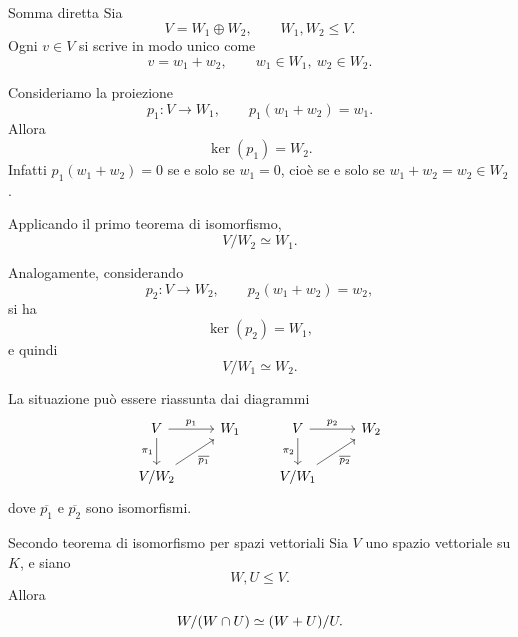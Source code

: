 \documentclass[a4paper]{article}
\begin{document}
\begin{radioactive}
\begin{snippetexample}{Somma diretta}
    Sia
    \[
        V=W_1 \oplus W_2,
        \qquad
        W_1,W_2 \leq V.
    \]
    Ogni \(v \in V\) si scrive in modo unico come
    \[
        v=w_1+w_2,
        \qquad
        w_1 \in W_1,\ w_2 \in W_2.
    \]

    Consideriamo la proiezione
    \[
        p_1 \colon V \to W_1,
        \qquad
        p_1(w_1+w_2)=w_1.
    \]
    Allora
    \[
        \ker(p_1)=W_2.
    \]
    Infatti \(p_1(w_1+w_2)=0\) se e solo se \(w_1=0\), cioè se e solo se \(w_1+w_2=w_2 \in W_2\).

    Applicando il primo teorema di isomorfismo,
    \[
        V/W_2 \simeq W_1.
    \]

    Analogamente, considerando
    \[
        p_2 \colon V \to W_2,
        \qquad
        p_2(w_1+w_2)=w_2,
    \]
    si ha
    \[
        \ker(p_2)=W_1,
    \]
    e quindi
    \[
        V/W_1 \simeq W_2.
    \]

    La situazione può essere riassunta dai diagrammi
    \[
        \begin{tikzcd}
            V \arrow[r, "p_1"] \arrow[d, "\pi_1"'] & W_1 \\
            V/W_2 \arrow[ur, "\overline{p_1}"']
        \end{tikzcd}
        \qquad
        \begin{tikzcd}
            V \arrow[r, "p_2"] \arrow[d, "\pi_2"'] & W_2 \\
            V/W_1 \arrow[ur, "\overline{p_2}"']
        \end{tikzcd}
    \]
    dove \(\overline{p_1}\) e \(\overline{p_2}\) sono isomorfismi.
\end{snippetexample}
\end{radioactive}

\begin{radioactive}
\begin{snippettheorem}{Secondo teorema di isomorfismo per spazi vettoriali}
    Sia \(V\) uno spazio vettoriale su \(K\), e siano
    \[
        W,U \leq V.
    \]
    Allora
    \[
        W/(W \cap U)
        \simeq
        (W+U)/U.
    \]
\end{snippettheorem}
\end{radioactive}
\end{document}

